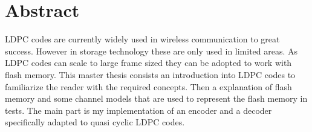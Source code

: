 
\chapter{Abstract}
LDPC codes are currently widely used in wireless communication to great success. However in storage technology these are only used in limited areas. As LDPC codes can scale to large frame sized they can be adopted to work with flash memory. This master thesis consists an introduction into LDPC codes to familiarize the reader with the required concepts. Then a explanation of flash memory and some channel models that are used to represent the flash memory in tests. The main part is my implementation of an encoder and a decoder specifically adapted to quasi cyclic LDPC codes.